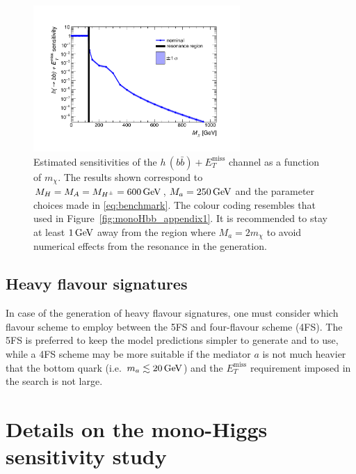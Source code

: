 \documentclass[a4paper, 11pt,notoc]{article}
\newcommand{\MET}{\ensuremath{E_T^\mathrm{miss}}\xspace}
\newcommand{\mA}{\ensuremath{M_{A}}\xspace}
\newcommand{\ma}{\ensuremath{M_{a}}\xspace}
\newcommand{\mH}{\ensuremath{M_{H}}\xspace}
\newcommand{\mHc}{\ensuremath{M_{H^{\pm}}}\xspace}
\begin{document}
\begin{figure}[t!]
\centering
\includegraphics[width=0.7\textwidth]{monoHbb_sensi_mDM_scan_red.pdf}
\vspace{-2mm}
\caption{Estimated sensitivities of  the $h \, (b \bar b)+\MET$ channel as a function of $m_\chi$. The  results shown correspond to $\mH = \mA = \mHc = 600 \, {\rm GeV}$, $\ma = 250 \, {\rm GeV}$ and the parameter choices made in \eqref{eq:benchmark}. The colour coding resembles that used in Figure~\ref{fig:monoHbb_appendix1}. It is recommended to stay at least $1 \, {\rm GeV}$ away from the region where $\ma = 2 m_\chi$ to avoid numerical effects from the resonance in the generation. }
\label{fig:monoHbb_appendix2}
\end{figure}

\subsection{Heavy flavour signatures}

In case of the generation of heavy flavour signatures, one must consider which flavour scheme to employ between the 5FS and four-flavour scheme (4FS). The 5FS is preferred to keep the model predictions simpler to generate and to use, while a 4FS scheme may be more suitable if the mediator $a$ is not much heavier that the bottom quark (i.e.~$m_a \lesssim 20 \, {\rm GeV}$) and the $\MET$ requirement imposed in the search is not large. 


\section{Details on the mono-Higgs sensitivity study}
\label{app:extramonoh}
\end{document}
